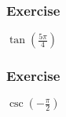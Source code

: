 \documentclass[12pt]{beamer}
\begin{document}
\begin{frame}
	\frametitle{Exercise}
	\vspace*{\fill}
	\vspace*{\fill}
	\vspace*{\fill}
	\vspace*{\fill}
	\initclock
	\LARGE
	\begin{center}
		$\tan{\left(\frac{5\pi}{4}\right)}$ %
	\end{center}
	\vspace*{\fill}
	\vspace*{\fill}
	\vspace*{\fill}
	\vspace*{\fill}
	\crono
\end{frame}
\begin{frame}
	\frametitle{Exercise}
	\vspace*{\fill}
	\vspace*{\fill}
	\vspace*{\fill}
	\vspace*{\fill}
	\initclock
	\LARGE
	\begin{center}
		$\csc{\left(-\frac{\pi}{2}\right)}$ %
	\end{center}
	\vspace*{\fill}
	\vspace*{\fill}
	\vspace*{\fill}
	\vspace*{\fill}
	\crono
\end{frame}
\end{document}
